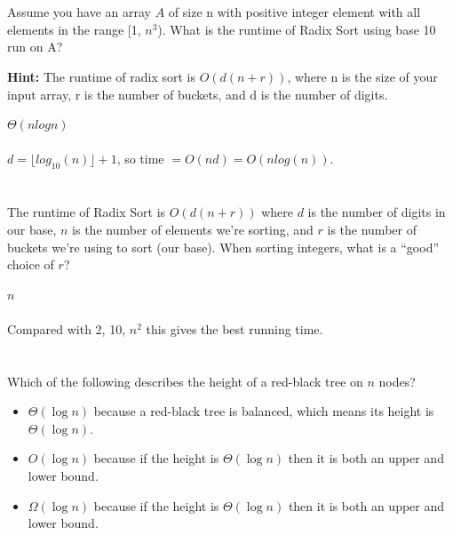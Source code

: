 \documentclass [12pt]{article}
\begin{document}
\section{} Assume you have an array $A$ of size n with positive integer element with all elements in the range [1, $n^3$).  What is the runtime of Radix Sort using base 10 run on A? 

\textbf{Hint:} The runtime of radix sort is $O(d (n+r))$, where n is the size of your input array, r is the number of buckets, and d is the number of digits.

\begin{Solution}
$\Theta(nlogn)$
\paragraph{} 
$d = \lfloor log_10(n) \rfloor + 1$, so time $= O(nd) = O(n log (n))$.

\end{Solution}


\section{} The runtime of Radix Sort is $O(d(n+r))$ where $d$ is the number of digits in our base, $n$ is the number of elements we're sorting, and $r$ is the number of buckets we're using to sort (our base). When sorting integers, what is a ``good'' choice of $r$?

\begin{Solution}
$n$
\paragraph{}
Compared with 2, 10, $n^2$ this gives the best running time.

\end{Solution}


\section{} Which of the following describes the height of a red-black tree on $n$ nodes?

\begin{Solution}
\begin{itemize}
    \item $\Theta(\log n)$ because a red-black tree is balanced, which means its height is $\Theta(\log n)$.
    \item $O(\log n)$ because if the height is $\Theta(\log n)$ then it is both an upper and lower bound.
    \item $\Omega(\log n)$ because if the height is $\Theta(\log n)$ then it is both an upper and lower bound.
\end{itemize}
\end{Solution}
\end{document}
